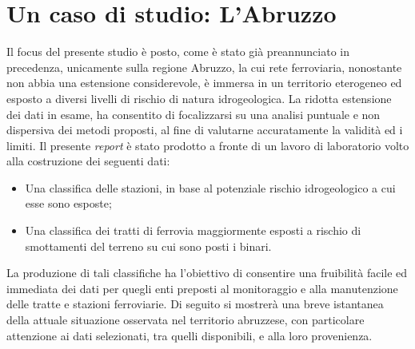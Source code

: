 \chapter{Un caso di studio: L'Abruzzo}
\label{ch:casodistudio}

Il focus del presente studio è posto, come è stato già preannunciato in precedenza, unicamente sulla regione Abruzzo, la cui rete ferroviaria, nonostante non abbia una estensione considerevole, è immersa in un territorio eterogeneo ed esposto a diversi livelli di rischio di natura idrogeologica. La ridotta estensione dei dati in esame, ha consentito di focalizzarsi su una analisi puntuale e non dispersiva dei metodi proposti, al fine di valutarne accuratamente la validità ed i limiti. Il presente \textit{report} è stato prodotto a fronte di un lavoro di laboratorio volto alla costruzione dei seguenti dati:
\begin{itemize}
\item  Una classifica delle stazioni, in base al potenziale rischio idrogeologico a cui esse sono esposte;
\item  Una classifica dei tratti di ferrovia maggiormente esposti a rischio di smottamenti del terreno su cui sono posti i binari.
\end{itemize}{}
La produzione di tali classifiche ha l’obiettivo di consentire una fruibilità facile ed immediata dei dati per quegli enti preposti al monitoraggio e alla manutenzione delle tratte e stazioni ferroviarie.
\newline
Di seguito si mostrerà una breve istantanea della attuale situazione osservata nel territorio abruzzese, con particolare attenzione ai dati selezionati, tra quelli disponibili, e alla loro provenienza.
